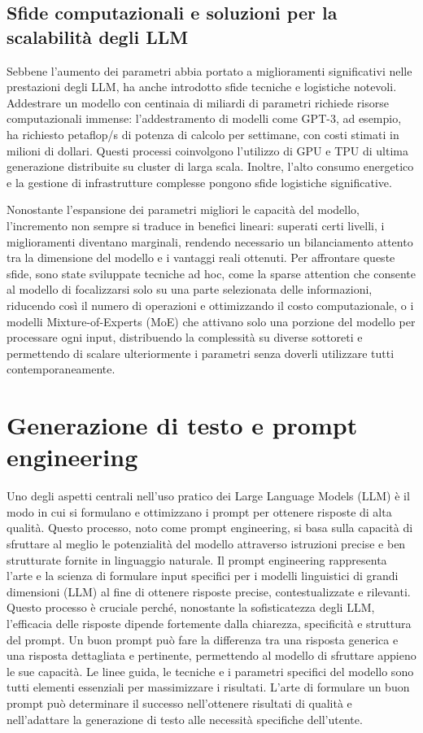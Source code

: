 \documentclass[target=mst,aauheader=,style=]{thud}
\begin{document}
\subsection{Sfide computazionali e soluzioni per la scalabilità degli LLM}
Sebbene l’aumento dei parametri abbia portato a miglioramenti significativi nelle prestazioni degli LLM, ha anche introdotto sfide tecniche e logistiche notevoli. Addestrare un modello con centinaia di miliardi di parametri richiede risorse computazionali immense: l’addestramento di modelli come GPT-3, ad esempio, ha richiesto petaflop/s di potenza di calcolo per settimane, con costi stimati in milioni di dollari. Questi processi coinvolgono l’utilizzo di GPU e TPU di ultima generazione distribuite su cluster di larga scala. Inoltre, l’alto consumo energetico e la gestione di infrastrutture complesse pongono sfide logistiche significative.\cite{hadi_2024}

Nonostante l’espansione dei parametri migliori le capacità del modello, l’incremento non sempre si traduce in benefici lineari: superati certi livelli, i miglioramenti diventano marginali, rendendo necessario un bilanciamento attento tra la dimensione del modello e i vantaggi reali ottenuti. Per affrontare queste sfide, sono state sviluppate tecniche ad hoc, come la sparse attention che consente al modello di focalizzarsi solo su una parte selezionata delle informazioni, riducendo così il numero di operazioni e ottimizzando il costo computazionale, o i modelli Mixture-of-Experts (MoE) che attivano solo una porzione del modello per processare ogni input, distribuendo la complessità su diverse sottoreti e permettendo di scalare ulteriormente i parametri senza doverli utilizzare tutti contemporaneamente.\cite{naveed_2024}

\section{Generazione di testo e prompt engineering}
Uno degli aspetti centrali nell’uso pratico dei Large Language Models (LLM) è il modo in cui si formulano e ottimizzano i prompt per ottenere risposte di alta qualità. Questo processo, noto come prompt engineering, si basa sulla capacità di sfruttare al meglio le potenzialità del modello attraverso istruzioni precise e ben strutturate fornite in linguaggio naturale. Il prompt engineering rappresenta l’arte e la scienza di formulare input specifici per i modelli linguistici di grandi dimensioni (LLM) al fine di ottenere risposte precise, contestualizzate e rilevanti. Questo processo è cruciale perché, nonostante la sofisticatezza degli LLM, l'efficacia delle risposte dipende fortemente dalla chiarezza, specificità e struttura del prompt. Un buon prompt può fare la differenza tra una risposta generica e una risposta dettagliata e pertinente, permettendo al modello di sfruttare appieno le sue capacità. Le linee guida, le tecniche e i parametri specifici del modello sono tutti elementi essenziali per massimizzare i risultati. L’arte di formulare un buon prompt può determinare il successo nell’ottenere risultati di qualità e nell’adattare la generazione di testo alle necessità specifiche dell’utente.\cite{sahoo_2024}\cite{zhao_2023}
\end{document}
